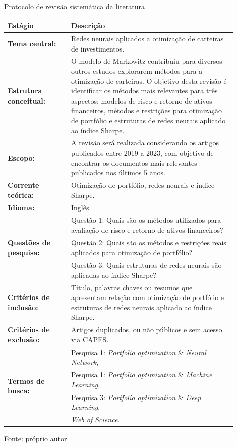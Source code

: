         \begin{quadro}[H]
            \centering
            \caption{Protocolo de revisão sistemática da literatura}
            \label{quadro:protocolo_revisao_sistematica}
            \begin{tabular}{p{0.25\linewidth}p{0.65\linewidth}}
                \hline
                \textbf{Estágio} & \textbf{Descrição} \\
                \hline \hline
                \textbf{Tema central:} & Redes neurais aplicados a otimização de carteiras de investimentos. \\ \hline
                \textbf{Estrutura conceitual:} & O modelo de Markowitz contribuiu para diversos outros estudos explorarem métodos para a otimização de carteiras. O objetivo desta revisão é identificar os métodos mais relevantes para três aspectos: modelos de risco e retorno de ativos financeiros, métodos e restrições para otimização de portfólio e estruturas de redes neurais aplicado ao índice Sharpe. \\ \hline
                \textbf{Escopo:} & A revisão será realizada considerando os artigos publicados entre 2019 a 2023, com objetivo de encontrar os documentos mais relevantes publicados nos últimos 5 anos. \\ \hline
                \textbf{Corrente teórica: } & Otimização de portfólio, redes neurais e índice Sharpe. \\ \hline
                \textbf{Idioma:} & Inglês. \\ \hline
                \multirow{3}{*}{\textbf{Questões de pesquisa:}} & Questão 1: Quais são os métodos utilizados para avaliação de risco e retorno de ativos financeiros? \\
                & Questão 2: Quais são os métodos e restrições reais aplicados para otimização de portfólio? \\
                & Questão 3: Quais estruturas de redes neurais são aplicadas ao índice Sharpe? \\ \hline
                \textbf{Critérios de inclusão:} & Título, palavras chaves ou resumos que apresentam relação com otimização de portfólio e estruturas de redes neurais aplicado ao índice Sharpe. \\ \hline
                \textbf{Critérios de exclusão:} & Artigos duplicados, ou não públicos e sem acesso via CAPES. \\ \hline
                \multirow{4}{*}{\textbf{\textbf{Termos de busca:}}} & Pesquisa 1: \textit{Portfolio optimization} \& \textit{Neural Network}, \\
                & Pesquisa 1: \textit{Portfolio optimization} \& \textit{Machine Learning}, \\
                & Pesquisa 3: \textit{Portfolio optimization} \& \textit{Deep Learning},\\
                \textbf{Fontes de pesquisa:} & \textit{Web of Science}. \\ \hline
            \end{tabular}
            \par \footnotesize Fonte: próprio autor. %
        \end{quadro}


